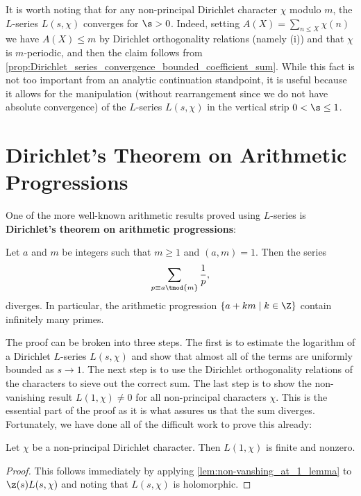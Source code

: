       It is worth noting that for any non-principal Dirichlet character \(\chi\) modulo \(m\), the \(L\)-series \(L(s,\chi)\) converges for \(\s > 0\). Indeed, setting \(A(X) = \sum_{n \le X}\chi(n)\) we have \(A(X) \le m\) by  Dirichlet orthogonality relations (namely (i)) and that \(\chi\) is \(m\)-periodic, and then the claim follows from \cref{prop:Dirichlet_series_convergence_bounded_coefficient_sum}. While this fact is not too important from an analytic continuation standpoint, it is useful because it allows for the manipulation (without rearrangement since we do not have absolute convergence) of the \(L\)-series \(L(s,\chi)\) in the vertical strip \(0 < \s \le 1\).
  \section{Dirichlet's Theorem on Arithmetic Progressions}
    One of the more well-known arithmetic results proved using \(L\)-series is \textbf{Dirichlet's theorem on arithmetic progressions}:

    \begin{theorem*}\label{thm:Dirichlet's_theorem_on_primes_in_arithmetic_progressions}
      Let \(a\) and \(m\) be integers such that \(m \ge 1\) and \((a,m) = 1\). Then the series
      \[
        \sum_{p \equiv a \tmod{m}}\frac{1}{p},
      \]
      diverges. In particular, the arithmetic progression \(\{a+km \mid k \in \Z\}\) contain infinitely many primes.
    \end{theorem*}

    The proof can be broken into three steps. The first is to estimate the logarithm of a Dirichlet \(L\)-series \(L(s,\chi)\) and show that almost all of the terms are uniformly bounded as \(s \to 1\). The next step is to use the Dirichlet orthogonality relations of the characters to sieve out the correct sum. The last step is to show the non-vanishing result \(L(1,\chi) \neq 0\) for all non-principal characters \(\chi\). This is the essential part of the proof as it is what assures us that the sum diverges. Fortunately, we have done all of the difficult work to prove this already:

    \begin{theorem}\label{thm:non-vanishing_of_Dirichlet_L-functions_at_s=1}
      Let \(\chi\) be a non-principal Dirichlet character. Then \(L(1,\chi)\) is finite and nonzero.
    \end{theorem}
    \begin{proof}
      This follows immediately by applying \cref{lem:non-vanshing_at_1_lemma} to \(\z(s)L(s,\chi)\) and noting that \(L(s,\chi)\) is holomorphic.
    \end{proof}

